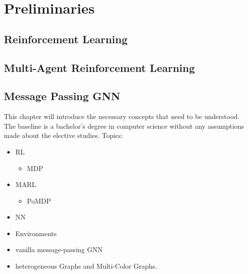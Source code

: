 
\chapter{Preliminaries}
\section{Reinforcement Learning}

\section{Multi-Agent Reinforcement Learning}

\section{Message Passing GNN}

This chapter will introduce the necessary concepts that need to be understood. The baseline is a bachelor's degree in computer science without any assumptions made about the elective studies.
Topics:
\begin{itemize}[noitemsep,nolistsep]
	\item RL
	\begin{itemize}[noitemsep,nolistsep]
		\item MDP
	\end{itemize}
	\item MARL
	\begin{itemize}[noitemsep,nolistsep]
		\item PoMDP
	\end{itemize}
	\item NN
	\item Environments
	\item vanilla message-passing GNN
	\item heterogeneous Graphs and Multi-Color Graphs.
\end{itemize}